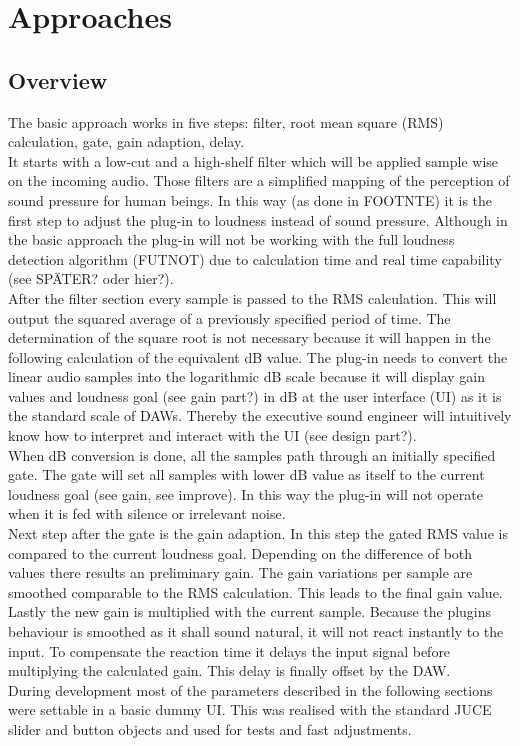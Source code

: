 \chapter{Approaches}
\label{chapter:approach}

\section{Overview}

The basic approach works in five steps: filter, root mean square (RMS) calculation, gate, gain adaption, delay.\\
It starts with a low-cut and a high-shelf filter which will be applied sample wise on the incoming audio. Those filters are a simplified mapping of the perception of sound pressure for human beings. In this way (as done in FOOTNTE) it is the first step to adjust the plug-in to loudness instead of sound pressure. Although in the basic approach the plug-in will not be working with the full loudness detection algorithm (FUTNOT) due to calculation time and real time capability (see SPÄTER? oder hier?).\\
After the filter section every sample is passed to the RMS calculation.  This will output the squared average of a previously specified period of time. The determination of the square root is not necessary because it will happen in the following calculation of the equivalent dB value. The plug-in needs to convert the linear audio samples into the logarithmic dB scale because it will display gain values and loudness goal (see gain part?) in dB at the user interface (UI) as it is the standard scale of DAWs. Thereby the executive sound engineer will intuitively know how to interpret and interact with the UI (see design part?).\\
When dB conversion is done, all the samples path through an initially specified gate. The gate will set all samples with lower dB value as itself to the current loudness goal (see gain, see improve). In this way the plug-in will not operate when it is fed with silence or irrelevant noise.\\
Next step after the gate is the gain adaption. In this step the gated RMS value is compared to the current loudness goal. Depending on the difference of both values there results an preliminary gain. The gain variations per sample are smoothed comparable to the RMS calculation. This leads to the final gain value.\\
Lastly the new gain is multiplied with the current sample. Because the plugins behaviour is smoothed as it shall sound natural, it will not react instantly to the input. To compensate the reaction time it delays the input signal before multiplying the calculated gain. This delay is finally offset by the DAW.\\ 
During development most of the parameters described in the following sections were settable in a basic dummy UI. This was realised with the standard JUCE slider and button objects and used for tests and fast adjustments.\\

